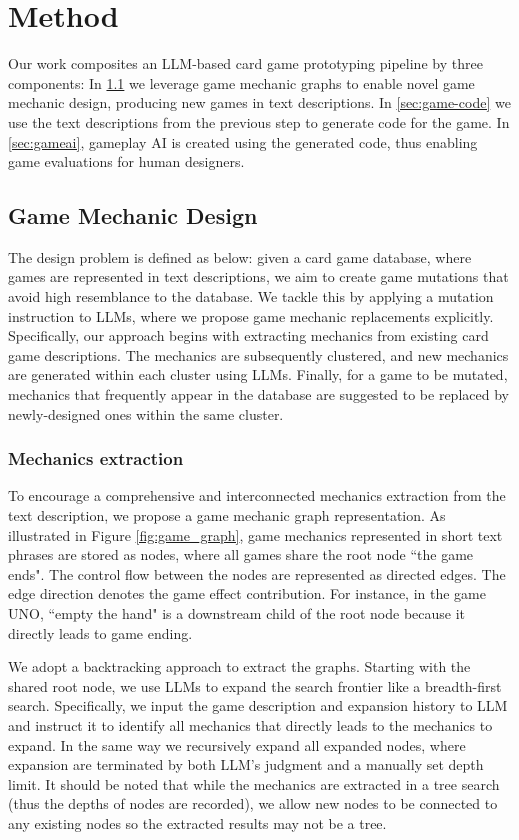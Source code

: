 \section{Method}

Our work composites an LLM-based card game prototyping pipeline by three components: In \ref{sec:game-logic} we leverage game mechanic graphs to enable novel game mechanic design, producing new games in text descriptions. In \ref{sec:game-code} we use the text descriptions from the previous step to generate code for the game. In \ref{sec:gameai}, gameplay AI is created using the generated code, thus enabling game evaluations for human designers.

\subsection{Game Mechanic Design}
\label{sec:game-logic}


The design problem is defined as below: given a card game database, where games are represented in text descriptions, we aim to create game mutations that avoid high resemblance to the database. We tackle this by applying a mutation instruction to LLMs, where we propose game mechanic replacements explicitly. Specifically, our approach begins with extracting mechanics from existing card game descriptions. The mechanics are subsequently clustered, and new mechanics are generated within each cluster using LLMs. Finally, for a game to be mutated, mechanics that frequently appear in the database are suggested to be replaced by newly-designed ones within the same cluster. 


\subsubsection{Mechanics extraction}


To encourage a comprehensive and interconnected mechanics extraction from the text description, we propose a game mechanic graph representation. As illustrated in Figure \ref{fig:game_graph}, game mechanics represented in short text phrases are stored as nodes, where all games share the root node ``the game ends". The control flow between the nodes are represented as directed edges. The edge direction denotes the game effect contribution. For instance, in the game UNO, ``empty the hand" is a downstream child of the root node because it directly leads to game ending.


We adopt a backtracking approach
to extract the graphs. Starting with the shared root node, we use LLMs to expand the search frontier like a breadth-first search. Specifically, we input the game description and expansion history to LLM and instruct it to identify all mechanics that directly leads to the mechanics to expand. In the same way we recursively expand all expanded nodes, where expansion are terminated by both LLM's judgment and a manually set depth limit. It should be noted that while the mechanics are extracted in a tree search (thus the depths of nodes are recorded), we allow new nodes to be connected to any existing nodes so the extracted results may not be a tree. 

